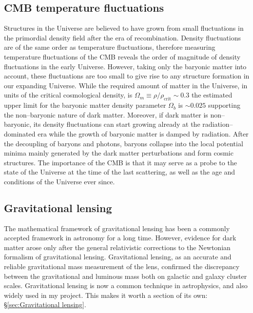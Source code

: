 \documentclass[a4wide,12pt]{book}
\newcommand{\ignore}[1]{}
\begin{document}
{\subsection{CMB temperature fluctuations}
\label{subsec:CMB}
Structures in the Universe are believed to have grown from small fluctuations in the primordial density field after the era of recombination. Density fluctuations are of the same order as temperature fluctuations\ignore{ ({\bf cite!}) \bf why? look back in the structure formation part!}, therefore measuring temperature fluctuations of the CMB reveals the order of magnitude of density fluctuations in the early Universe. However, taking only the baryonic matter into account, these fluctuations are too small to give rise to any structure formation in our expanding Universe. While the required amount of matter in the Universe, in units of the critical cosmological density, is $\Omega_m \equiv \rho/\rho_\mathrm{crit}\sim 0.3$ the estimated upper limit for the baryonic matter density parameter $\Omega_b$ is $ \sim 0.025$ \citep[][]{Planck2015} supporting the non--baryonic nature of dark matter. Moreover, if dark matter is non--baryonic, its density fluctuations can start growing already at the radiation--dominated era while the growth of baryonic matter is damped by radiation. After the decoupling of baryons and photons, baryons collapse into the local potential minima mainly generated by the dark matter perturbations and form cosmic structures. The importance of the CMB is that it may serve as a probe to the state of the Universe at the time of the last scattering, as well as the age and conditions of the Universe ever since.

\subsection{Gravitational lensing}
The mathematical framework of gravitational lensing has been a commonly accepted framework in astronomy for a long time. However, evidence for dark matter arose only after the general relativistic corrections to the Newtonian formalism of gravitational lensing. Gravitational lensing, as an accurate and reliable gravitational mass measurement of the lens, confirmed the discrepancy between the gravitational and luminous mass both on galactic and galaxy cluster scales. Gravitational lensing is now a common technique in astrophysics, and also widely used in my project. This makes it worth a section of its own: \S \ref{sec:Gravitational lensing}.

}
\end{document}
